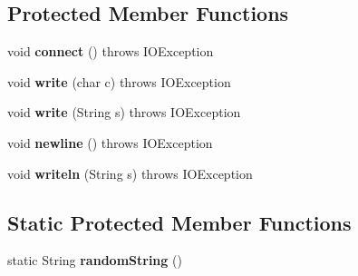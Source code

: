 \subsection*{Protected Member Functions}
\begin{DoxyCompactItemize}
\item 
\hypertarget{classj_bittorrent_a_p_i_1_1_client_http_request_a2a192b26242de52b21db021fb9463e70}{
void {\bfseries connect} ()  throws IOException }
\label{classj_bittorrent_a_p_i_1_1_client_http_request_a2a192b26242de52b21db021fb9463e70}

\item 
\hypertarget{classj_bittorrent_a_p_i_1_1_client_http_request_a1495f7b87e90bf09ddff82dc48c24ea6}{
void {\bfseries write} (char c)  throws IOException }
\label{classj_bittorrent_a_p_i_1_1_client_http_request_a1495f7b87e90bf09ddff82dc48c24ea6}

\item 
\hypertarget{classj_bittorrent_a_p_i_1_1_client_http_request_a2ff3946a97bdc56eb4a68c8c869bdf59}{
void {\bfseries write} (String s)  throws IOException }
\label{classj_bittorrent_a_p_i_1_1_client_http_request_a2ff3946a97bdc56eb4a68c8c869bdf59}

\item 
\hypertarget{classj_bittorrent_a_p_i_1_1_client_http_request_a2efe238b9bf8feb7f77c59898c8ddcf9}{
void {\bfseries newline} ()  throws IOException }
\label{classj_bittorrent_a_p_i_1_1_client_http_request_a2efe238b9bf8feb7f77c59898c8ddcf9}

\item 
\hypertarget{classj_bittorrent_a_p_i_1_1_client_http_request_a69b6ee30663648c69403dc899ce230f2}{
void {\bfseries writeln} (String s)  throws IOException }
\label{classj_bittorrent_a_p_i_1_1_client_http_request_a69b6ee30663648c69403dc899ce230f2}

\end{DoxyCompactItemize}
\subsection*{Static Protected Member Functions}
\begin{DoxyCompactItemize}
\item 
\hypertarget{classj_bittorrent_a_p_i_1_1_client_http_request_a6f3ebe308a296b51e6903fdb4786d04d}{
static String {\bfseries randomString} ()}
\label{classj_bittorrent_a_p_i_1_1_client_http_request_a6f3ebe308a296b51e6903fdb4786d04d}

\end{DoxyCompactItemize}
